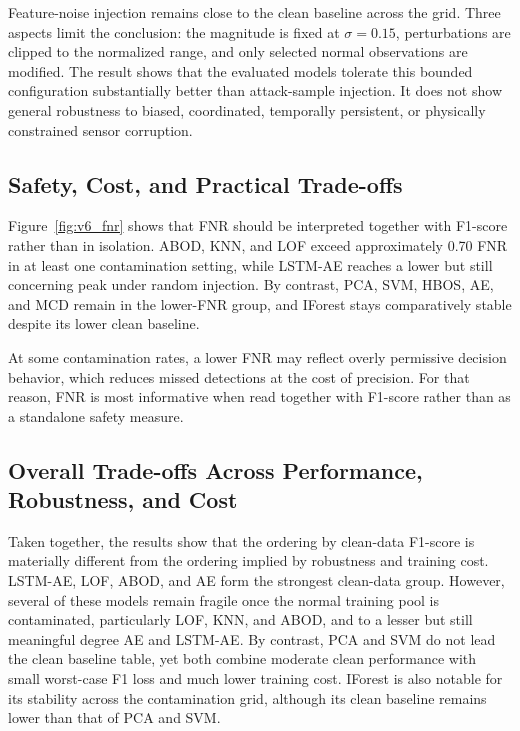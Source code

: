 \documentclass[10pt,conference]{IEEEtran}
\begin{document}
Feature-noise injection remains close to the clean baseline across the grid. Three aspects limit the conclusion: the magnitude is fixed at $\sigma=0.15$, perturbations are clipped to the normalized range, and only selected normal observations are modified. The result shows that the evaluated models tolerate this bounded configuration substantially better than attack-sample injection. It does not show general robustness to biased, coordinated, temporally persistent, or physically constrained sensor corruption.

\subsection{Safety, Cost, and Practical Trade-offs}

Figure~\ref{fig:v6_fnr} shows that FNR should be interpreted together with F1-score rather than in isolation. ABOD, KNN, and LOF exceed approximately 0.70 FNR in at least one contamination setting, while LSTM-AE reaches a lower but still concerning peak under random injection. By contrast, PCA, SVM, HBOS, AE, and MCD remain in the lower-FNR group, and IForest stays comparatively stable despite its lower clean baseline.

At some contamination rates, a lower FNR may reflect overly permissive decision behavior, which reduces missed detections at the cost of precision. For that reason, FNR is most informative when read together with F1-score rather than as a standalone safety measure.

\subsection{Overall Trade-offs Across Performance, Robustness, and Cost}

Taken together, the results show that the ordering by clean-data F1-score is materially different from the ordering implied by robustness and training cost. LSTM-AE, LOF, ABOD, and AE form the strongest clean-data group. However, several of these models remain fragile once the normal training pool is contaminated, particularly LOF, KNN, and ABOD, and to a lesser but still meaningful degree AE and LSTM-AE. By contrast, PCA and SVM do not lead the clean baseline table, yet both combine moderate clean performance with small worst-case F1 loss and much lower training cost. IForest is also notable for its stability across the contamination grid, although its clean baseline remains lower than that of PCA and SVM.
\end{document}
